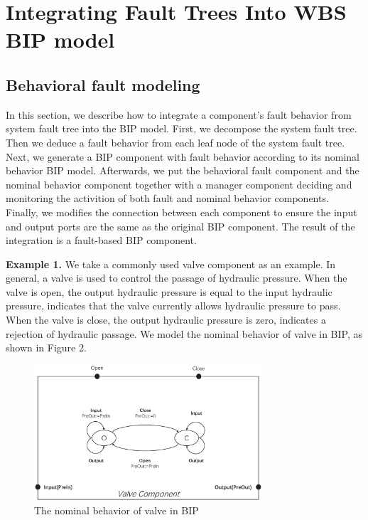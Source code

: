 

\section{Integrating Fault Trees Into WBS BIP model}

\subsection{Behavioral fault modeling}
In this section, we describe how to integrate a component's fault behavior from system fault tree\cite{ft} into the BIP model. First, we decompose the system fault tree. Then we deduce a fault behavior from each leaf node of the system fault tree. Next, we generate a BIP component with fault behavior according to its nominal behavior BIP model. Afterwards, we put the behavioral fault component and the nominal behavior component together with a manager component deciding and monitoring the activition of both fault and nominal behavior components. Finally, we modifies the connection between each component to ensure the input and output ports are the same as the original BIP component. The result of the integration is a fault-based BIP component.

\textbf{Example 1.} We take a commonly used valve component as an example. In general, a valve is used to control the passage of hydraulic pressure. When the valve is open, the output hydraulic pressure is equal to the input hydraulic pressure, indicates that the valve currently allows hydraulic pressure to pass. When the valve is close, the output hydraulic pressure is zero, indicates a rejection of hydraulic passage. We model the nominal behavior of valve in BIP, as shown in Figure 2.

\begin{figure}[htbp]
	\centerline{\includegraphics[width=85mm]{figure/example_origin.eps}}
	\caption{The nominal behavior of valve in BIP}
	\label{example_BIP_nominal}
\end{figure}


